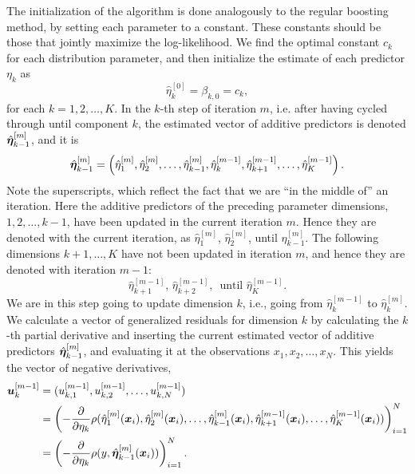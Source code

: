 The initialization of the algorithm is done analogously to the regular boosting method, by setting each parameter to a constant.
These constants should be those that jointly maximize the log-likelihood.
We find the optimal constant $c_k$ for each distribution parameter, and then initialize the estimate of each predictor $\eta_k$ as
\begin{equation*}
    \hat{\eta}_k^{[0]}=\beta_{k,0}=c_k,
\end{equation*}
for each $k=1,2,\ldots,K$.
In the $k$-th step of iteration $m$, i.e. after having cycled through until component $k$, the estimated vector of additive predictors is denoted $\hat{\boldsymbol{\eta}}_{k-1}^{[m]}$, and it is
\begin{equation*}
    \hat{\boldsymbol{\eta}}_{k-1}^{[m]}=\left(\hat{\eta}_1^{[m]},\hat{\eta}_2^{[m]},\ldots,\hat{\eta}_{k-1}^{[m]},\hat{\eta}_{k}^{[m-1]},\hat{\eta}_{k+1}^{[m-1]},\ldots,\hat{\eta}_{K}^{[m-1]}\right).
\end{equation*}
Note the superscripts, which reflect the fact that we are ``in the middle of'' an iteration.
Here the additive predictors of the preceding parameter dimensions, $1,2,\ldots,k-1$, have been updated in the current iteration $m$.
Hence they are denoted with the current iteration, as $\hat{\eta}_1^{[m]}$, $\hat{\eta}_2^{[m]}$, until $\hat{\eta}_{k-1}^{[m]}$.
The following dimensions $k+1,\ldots,K$ have not been updated in iteration $m$, and hence they are denoted with iteration $m-1$:
\begin{equation*}
    \hat{\eta}_{k+1}^{[m-1]},\, \hat{\eta}_{k+2}^{[m-1]},\,\text{ until }\hat{\eta}_{K}^{[m-1]}.
\end{equation*}
We are in this step going to update dimension $k$, i.e., going from $\hat{\eta}_{k}^{[m-1]}$ to $\hat{\eta}_{k}^{[m]}$.
We calculate a vector of generalized residuals for dimension $k$ by calculating the $k$-th partial derivative and inserting the current estimated vector of additive predictors $\hat{\boldsymbol{\eta}}_{k-1}^{[m]}$, and evaluating it at the observations $x_1,x_2,\ldots,x_N$.
This yields the vector of negative derivatives,
\begin{align*}
    \bm{u}_k^{[m-1]}&=(u_{k,1}^{[m-1]},u_{k,2}^{[m-1]},\ldots,u_{k,N}^{[m-1]})\\
    &=\left(-\frac{\partial}{\partial \eta_k}\rho(\hat{\eta}_1^{[m]}(\bm{x}_i),\hat{\eta}_2^{[m]}(\bm{x}_i),\ldots,\hat{\eta}_{k-1}^{[m]}(\bm{x}_i),\hat{\eta}_{k+1}^{[m-1]}(\bm{x}_i),\ldots,\hat{\eta}_{K}^{[m-1]}(\bm{x}_i))\right)_{i=1}^N \\
    &=\left(-\frac{\partial}{\partial \eta_k}\rho(y,\hat{\boldsymbol{\eta}}^{[m]}_{k-1}(\bm{x}_i))\right)_{i=1}^N.
\end{align*}
